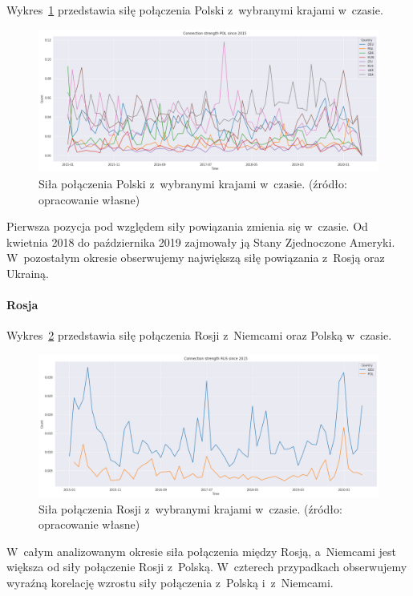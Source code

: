 \documentclass[11pt]{report}
\begin{document}
    Wykres~\ref{fig:PLConnection} przedstawia siłę połączenia Polski z~wybranymi krajami w~czasie.
    \begin{figure}[!htp]
        \centering
        \includegraphics[width=\linewidth]{fig/PL/POLConnection.png}
        \caption{Siła połączenia Polski z~wybranymi krajami w~czasie. (źródło: opracowanie własne)}
        \label{fig:PLConnection}
    \end{figure}
    Pierwsza pozycja pod względem siły powiązania zmienia się w~czasie.
    Od kwietnia 2018 do października 2019 zajmowały ją Stany Zjednoczone Ameryki.
    W~pozostałym okresie obserwujemy największą siłę powiązania z~Rosją oraz Ukrainą.

    \paragraph{Rosja}

    Wykres~\ref{fig:RUSConnection} przedstawia siłę połączenia Rosji z~Niemcami oraz Polską w~czasie.
    \begin{figure}[!htp]
        \centering
        \includegraphics[width=\linewidth]{fig/RUS/RUSConnection.png}
        \caption{Siła połączenia Rosji z~wybranymi krajami w~czasie. (źródło: opracowanie własne)}
        \label{fig:RUSConnection}
    \end{figure}
    W~całym analizowanym okresie siła połączenia między Rosją, a~Niemcami jest większa od siły połączenie Rosji z~Polską.
    W~czterech przypadkach obserwujemy wyraźną korelację wzrostu siły połączenia z~Polską i~z~Niemcami.
\end{document}
